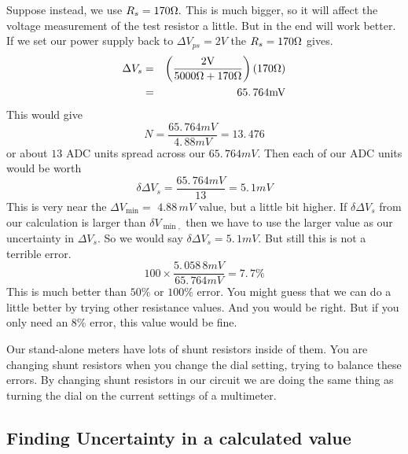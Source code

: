 Suppose instead, we use $R_{s}=170\unit{%
\Omega%
}.$ This is much bigger, so it will affect the voltage measurement of the
test resistor a little. But in the end will work better. If we set our power
supply back to $\Delta V_{ps}=2\unit{V}$ the $R_{s}=170\unit{%
\Omega%
}$ gives. 
\begin{eqnarray*}
\Delta V_{s} &=&\left( \frac{2\unit{V}}{5000\unit{%
\Omega%
}+170\unit{%
\Omega%
}}\right) \left( 170\unit{%
\Omega%
}\right) \\
&=&65.\,\allowbreak 764\unit{mV}
\end{eqnarray*}%
This would give 
\begin{equation*}
N=\frac{65.\,\allowbreak 764\unit{mV}}{4.\,\allowbreak 88\unit{mV}}%
=13.\,\allowbreak 476
\end{equation*}%
or about $13$ ADC units spread across our $65.\,\allowbreak 764\unit{mV}.$
Then each of our ADC units would be worth 
\begin{equation*}
\delta \Delta V_{s}=\frac{65.\,\allowbreak 764\unit{mV}}{13}=5.\,\allowbreak
1\unit{mV}
\end{equation*}%
This is very near the $\Delta V_{\min }=$ $4.88\,\allowbreak \unit{mV}$
value, but a little bit higher. If $\delta \Delta V_{s}$ from our
calculation is larger than $\delta V_{\min ,}$ then we have to use the
larger value as our uncertainty in $\Delta V_{s}.$ So we would say $\delta
\Delta V_{s}=5.\,\allowbreak 1\unit{mV}.$ But still this is not a terrible
error. 
\begin{equation*}
100\times \frac{5.\,\allowbreak 058\,8\unit{mV}}{65.\,\allowbreak 764\unit{mV%
}}=7.\,\allowbreak 7\%
\end{equation*}%
This is much better than $50\%$ or $100\%$ error. You might guess that we
can do a little better by trying other resistance values. And you would be
right. But if you only need an $8\%$ error, this value would be fine.

Our stand-alone meters have lots of shunt resistors inside of them. You are
changing shunt resistors when you change the dial setting, trying to balance
these errors. By changing shunt resistors in our circuit we are doing the
same thing as turning the dial on the current settings of a multimeter.

\subsection{Finding Uncertainty in a calculated value}

